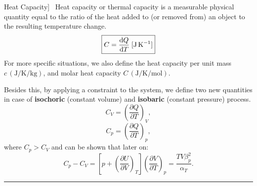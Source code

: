 \documentclass[UTF8]{book}
\newenvironment{theorem}[2][Theorem]{\begin{trivlist}
\item[\hskip \labelsep {\bfseries #1}\hskip \labelsep {\bfseries }]}{\end{trivlist}}
\begin{document}
\begin{theorem}
[Heat Capacity]~  {Heat capacity or thermal capacity is a measurable physical quantity equal to the ratio of the heat added to (or removed from) an object to the resulting temperature change.}
\[\boxed{C=\dv{Q}{T} \; [\si{\joule\per\kelvin}]}\]
{For more specific situations, we also define the heat capacity 
per unit mass $c\,(\si{\joule\per\kelvin\per\kilo\gram})$, 
and molar heat capacity $C\,(\si{\joule\per\kelvin\per\mole})$}.

{Besides this, by applying a constraint to the system, we define 
two new quantities in case of \textbf{isochoric} (constant volume) 
and \textbf{isobaric} (constant pressure) process.}
$$C_V=\left(\dfrac{\partial Q}{\partial T}\right)_V,$$
$$C_p=\left(\dfrac{\partial Q}{\partial T}\right)_p,$$
where $C_p > C_V$ { and can be shown that later on:}
\begin{equation}\label{heat capacity}
C_p-C_V=\left[p+\left(\dfrac{\partial U}{\partial V}\right)_T\right]\left(\dfrac{\partial V}{\partial T}\right)_p=\dfrac{TV\beta _p^2}{\alpha _T }.
\end{equation}
\end{theorem}
\rule{\textwidth}{1pt}

\end{document}
